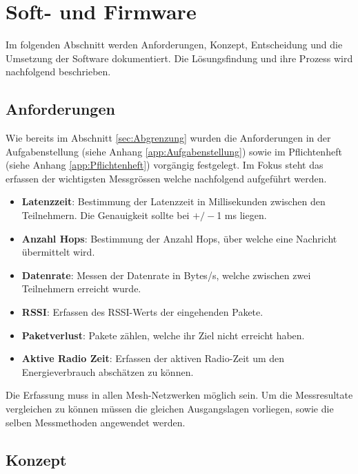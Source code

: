\clearpage
\section{Soft- und Firmware}\label{sec:Soft-undFirmware}


Im folgenden Abschnitt werden Anforderungen, Konzept, Entscheidung und die Umsetzung der Software dokumentiert. Die Lösungsfindung und ihre Prozess wird nachfolgend beschrieben. 

\subsection{Anforderungen}\label{subsec:Software_Anforderungen}

Wie bereits im Abschnitt \ref{sec:Abgrenzung} wurden die Anforderungen in der Aufgabenstellung (siehe Anhang \ref{app:Aufgabenstellung}) sowie im Pflichtenheft (siehe Anhang \ref{app:Pflichtenheft}) vorgängig festgelegt. Im Fokus steht das erfassen der wichtigsten Messgrössen welche nachfolgend aufgeführt werden. \\

\begin{itemize}
	\item \textbf{Latenzzeit}: Bestimmung der Latenzzeit in Millisekunden zwischen den Teilnehmern. Die Genauigkeit sollte bei $+/-$1 ms liegen.  
	\item \textbf{Anzahl Hops}: Bestimmung der Anzahl Hops, über welche eine Nachricht übermittelt wird.
	\item \textbf{Datenrate}: Messen der Datenrate in Bytes/s, welche zwischen zwei Teilnehmern erreicht wurde. 
	\item \textbf{RSSI}: Erfassen des RSSI-Werts der eingehenden Pakete.
	\item \textbf{Paketverlust}: Pakete zählen, welche ihr Ziel nicht erreicht haben.  
	\item \textbf{Aktive Radio Zeit}: Erfassen der aktiven Radio-Zeit um den Energieverbrauch abschätzen zu können. 
\end{itemize}


Die Erfassung muss in allen Mesh-Netzwerken möglich sein. Um die Messresultate vergleichen zu können müssen die gleichen Ausgangslagen vorliegen, sowie die selben Messmethoden angewendet werden. 



\subsection{Konzept}\label{subsec:Software_Konzept}

